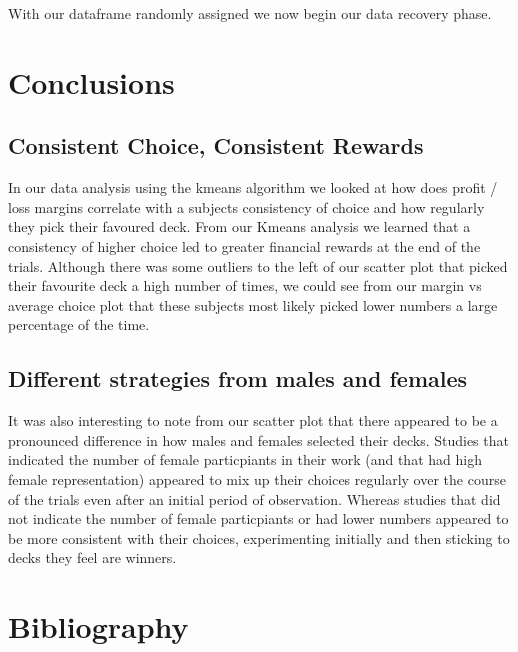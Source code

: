 \documentclass[letterpaper,10pt,english]{jupyterBook}
\begin{document}
\sphinxAtStartPar
With our dataframe randomly assigned we now begin our data recovery phase.


\chapter{Conclusions}
\label{\detokenize{conclusion:conclusions}}\label{\detokenize{conclusion::doc}}

\section{Consistent Choice, Consistent Rewards}
\label{\detokenize{conclusion:consistent-choice-consistent-rewards}}
\sphinxAtStartPar
In our data analysis using the k\sphinxhyphen{}means algorithm we looked at how does profit / loss margins correlate with a subjects consistency of choice and how regularly they pick their favoured deck. From our K\sphinxhyphen{}means analysis we learned that a consistency of higher choice led to greater financial rewards at the end of the trials. Although there was some outliers to the left of our scatter plot that picked their favourite deck a high number of times, we could see from our margin vs average choice plot that these subjects most likely picked lower numbers a large percentage of the time.

\sphinxAtStartPar
{}


\section{Different strategies from males and females}
\label{\detokenize{conclusion:different-strategies-from-males-and-females}}
\sphinxAtStartPar
It was also interesting to note from our scatter plot that there appeared to be a pronounced difference in how males and females selected their decks. Studies that indicated the number of female particpiants in their work (and that had high female representation) appeared to mix up their choices regularly over the course of the trials even after an initial period of observation. Whereas studies that did not indicate the number of female particpiants or had lower numbers appeared to be more consistent with their choices, experimenting initially and then sticking to decks they feel are winners.


\chapter{Bibliography}
\label{\detokenize{zbibliography:bibliography}}\label{\detokenize{zbibliography::doc}}
\sphinxAtStartPar
\end{document}
